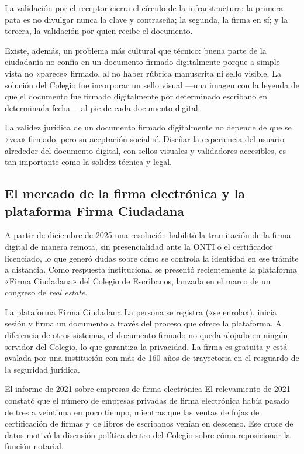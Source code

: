 \documentclass[12pt,oneside]{book}
\begin{document}
La validación por el receptor cierra el círculo de la infraestructura: la primera pata es no divulgar nunca la clave y contraseña; la segunda, la firma en sí; y la tercera, la validación por quien recibe el documento.

Existe, además, un problema más cultural que técnico: buena parte de la ciudadanía no confía en un documento firmado digitalmente porque a simple vista no «parece» firmado, al no haber rúbrica manuscrita ni sello visible. La solución del Colegio fue incorporar un sello visual ---una imagen con la leyenda de que el documento fue firmado digitalmente por determinado escribano en determinada fecha--- al pie de cada documento digital.

\begin{important}
La validez jurídica de un documento firmado digitalmente no depende de que se «vea» firmado, pero su aceptación social sí. Diseñar la experiencia del usuario alrededor del documento digital, con sellos visuales y validadores accesibles, es tan importante como la solidez técnica y legal.
\end{important}

\subsection{El mercado de la firma electrónica y la plataforma Firma Ciudadana}

A partir de diciembre de 2025 una resolución habilitó la tramitación de la firma digital de manera remota, sin presencialidad ante la ONTI o el certificador licenciado, lo que generó dudas sobre cómo se controla la identidad en ese trámite a distancia. Como respuesta institucional se presentó recientemente la plataforma «Firma Ciudadana» del Colegio de Escribanos, lanzada en el marco de un congreso de \emph{real estate}.

\begin{example}{La plataforma Firma Ciudadana}
La persona se registra («se enrola»), inicia sesión y firma un documento a través del proceso que ofrece la plataforma. A diferencia de otros sistemas, el documento firmado no queda alojado en ningún servidor del Colegio, lo que garantiza la privacidad. La firma es gratuita y está avalada por una institución con más de 160 años de trayectoria en el resguardo de la seguridad jurídica.
\end{example}

\begin{example}{El informe de 2021 sobre empresas de firma electrónica}
El relevamiento de 2021 constató que el número de empresas privadas de firma electrónica había pasado de tres a veintiuna en poco tiempo, mientras que las ventas de fojas de certificación de firmas y de libros de escribanos venían en descenso. Ese cruce de datos motivó la discusión política dentro del Colegio sobre cómo reposicionar la función notarial.
\end{example}
\end{document}
